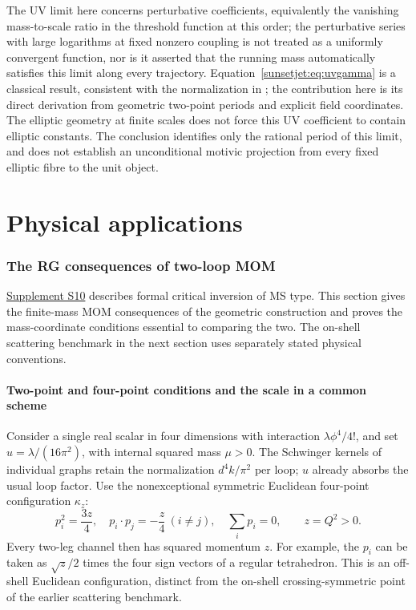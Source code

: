 \documentclass[11pt,a4paper,oneside]{article}
\theoremstyle{plain}
\theoremstyle{definition}
\theoremstyle{remark}
\newcommand{\Q}{\mathbb Q}
\newcommand{\Z}{\mathbb Z}
\numberwithin{equation}{section}
\newcommand{\otherref}[2]{\href{#1.pdf}{#2}}
\begin{document}
The UV limit here concerns perturbative coefficients, equivalently the vanishing mass-to-scale ratio in the threshold function at this order;
the perturbative series with large logarithms at fixed nonzero coupling is not treated as a uniformly convergent function,
nor is it asserted that the running mass automatically satisfies this limit along every trajectory.
Equation~\eqref{sunsetjet:eq:uvgamma} is a classical result, consistent with the normalization in
\cite[Eqs.~(1), (2), (5), (9), $n=1$]{kp};
the contribution here is its direct derivation from geometric two-point periods and explicit field coordinates.
The elliptic geometry at finite scales does not force this UV coefficient to contain elliptic constants.
The conclusion identifies only the rational period of this limit,
and does not establish an unconditional motivic projection from every fixed elliptic fibre to the unit object.


\endgroup

\clearpage\part{Physical applications}

\section{The RG consequences of two-loop MOM}\label{ch:momrg}

\begingroup

\otherref{feynman_periods_supplement_en}{Supplement S10} describes formal critical inversion of MS type. This section gives the finite-mass MOM consequences of the geometric construction and proves the mass-coordinate conditions essential to comparing the two. The on-shell scattering benchmark in the next section uses separately stated physical conventions.

\providecommand{\Q}{\mathbb Q}
\providecommand{\SR}{S_{\mathrm R}}
\providecommand{\gphi}{\gamma_\phi}
\providecommand{\dd}{\mathcal D}
\renewcommand{\Z}{\mathcal Z}

\subsection{Two-point and four-point conditions and the scale in a common scheme}
Consider a single real scalar in four dimensions with interaction $\lambda\phi^4/4!$, and set
$u=\lambda/(16\pi^2)$, with internal squared mass $\mu>0$.
The Schwinger kernels of individual graphs retain the normalization $d^4k/\pi^2$ per loop;
$u$ already absorbs the usual loop factor.
Use the nonexceptional symmetric Euclidean four-point configuration $\kappa_z$:
\begin{equation}\label{momrg:eq:symmetric}
 p_i^2=\frac{3z}{4},\quad p_i\cdot p_j=-\frac z4\ (i\ne j),
 \quad \sum_i p_i=0,\qquad z=Q^2>0.
\end{equation}
Every two-leg channel then has squared momentum $z$.
For example, the $p_i$ can be taken as $\sqrt z/2$ times the four sign vectors of a regular tetrahedron.
This is an off-shell Euclidean configuration, distinct from the on-shell crossing-symmetric point of the earlier scattering benchmark.
\end{document}
